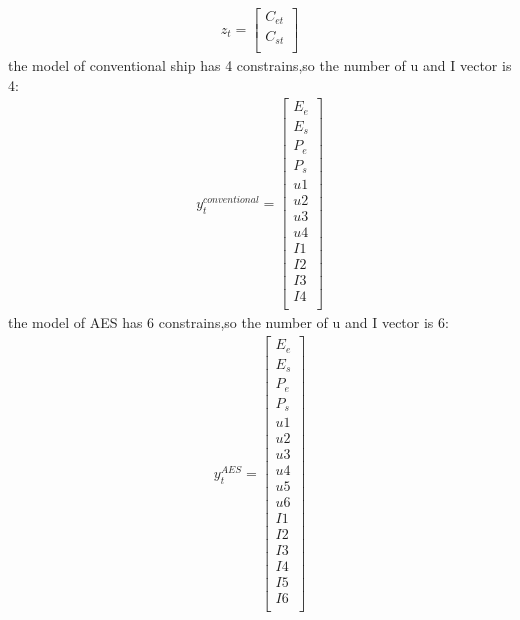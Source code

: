 \documentclass[11pt]{article} %
\begin{document}
\begin{align}  
    z_t = \begin{bmatrix}
        C_{et}\\
        C_{st}\\
    \end{bmatrix}
\end{align}
the model of conventional ship has 4 constrains,so the number of u and I vector is 4:
\begin{align}  
    y^{conventional}_t = \begin{bmatrix}
        E_{e}\\
        E_{s}\\
        P_{e}\\
        P_{s}\\
        u1\\
        u2\\
        u3\\
        u4\\
        I1\\
        I2\\
        I3\\
        I4\\
    \end{bmatrix}
\end{align}
the model of AES has 6 constrains,so the number of u and I vector is 6:
\begin{align}  
    y^{AES}_t = \begin{bmatrix}
        E_{e}\\
        E_{s}\\
        P_{e}\\
        P_{s}\\
        u1\\
        u2\\
        u3\\
        u4\\
        u5\\
        u6\\
        I1\\
        I2\\
        I3\\
        I4\\
        I5\\
        I6\\
    \end{bmatrix}
\end{align}
\end{document}
